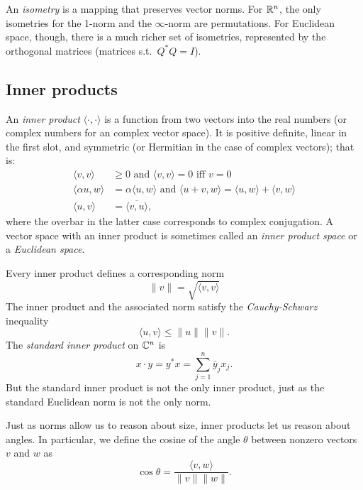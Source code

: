 \documentclass[12pt, leqno]{article}
\begin{document}
An {\em isometry} is a mapping that preserves vector norms.
For $\mathbb{R}^n$, the only isometries for the 1-norm and the $\infty$-norm
are permutations.  For Euclidean space, though, there is a much
richer set of isometries, represented by the orthogonal matrices
(matrices s.t.~$Q^* Q = I$).


\subsection{Inner products}

An {\em inner product} $\langle \cdot, \cdot \rangle$
is a function from two vectors into the real
numbers (or complex numbers for an complex vector space).  It is
positive definite, linear in the first slot, and symmetric (or
Hermitian in the case of complex vectors); that is:
\begin{align*}
  \langle v, v \rangle & \geq 0 \mbox{ and }
  \langle v, v \rangle = 0 \mbox{ iff } v = 0 \\
%
  \langle \alpha u, w \rangle &= \alpha \langle u, w \rangle
  \mbox{ and }
  \langle u+v, w \rangle = \langle u, w \rangle + \langle v, w \rangle \\
%
  \langle u, v \rangle &= \overline{\langle v, u \rangle},
\end{align*}
where the overbar in the latter case corresponds to complex
conjugation.  A vector space with an inner product is sometimes
called an {\em inner product space} or a {\em Euclidean space}.

Every inner product defines a corresponding norm
\[
  \|v\| = \sqrt{ \langle v, v \rangle}
\]
The inner product and the associated norm satisfy
the {\em Cauchy-Schwarz} inequality
\[
  \langle u, v \rangle \leq \|u\| \|v\|.
\]
The {\em standard inner product} on $\mathbb{C}^n$ is
\[
  x \cdot y = y^* x = \sum_{j=1}^n \bar{y}_j x_j.
\]
But the standard inner product is not the only inner product,
just as the standard Euclidean norm is not the only norm.

Just as norms allow us to reason about size, inner products let us
reason about angles.  In particular, we define the cosine of
the angle $\theta$ between nonzero vectors $v$ and $w$ as
\[
  \cos \theta = \frac{\langle v, w \rangle}{\|v\| \|w\|}.
\]
\end{document}
